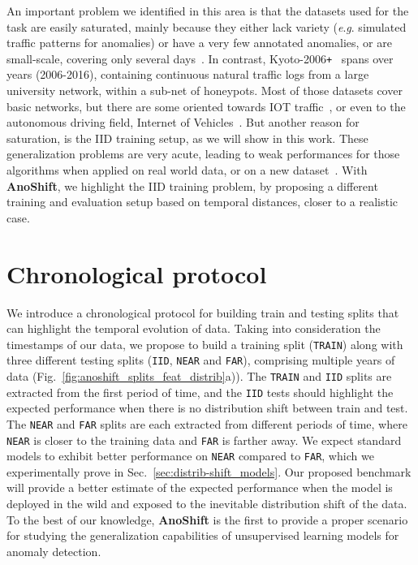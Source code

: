 \documentclass{article}
\newcommand{\eg}{\textit{e}.\textit{g}. }
\begin{document}
An important problem we identified in this area is that the datasets used for the task are easily saturated, mainly because they either lack variety (\eg simulated traffic patterns for anomalies) or have a very few annotated anomalies, or are small-scale, covering only several days~\cite{kddcup, NSL-KDD, cic_ids_2017, netflow_v1_iot, netflow_v2_iot, unsw_nb15, lanl, zyell_nctu, compare_nids}. In contrast, Kyoto-2006\texttt{+}~\cite{kyoto2006} spans over  years (2006-2016), containing continuous natural traffic logs from a large university network, within a sub-net of honeypots. Most of those datasets cover basic networks, but there are some oriented towards IOT traffic~\cite{netflow_v2_iot}, or even to the autonomous driving field, Internet of Vehicles~\cite{tree}. But another reason for saturation, is the IID training setup, as we will show in this work. These generalization problems are very acute, leading to weak performances for those algorithms when applied on real world data, or on a new dataset~\cite{nids_generalization}. With \textbf{AnoShift}, we highlight the IID training problem, by proposing a different training and evaluation setup based on temporal distances, closer to a realistic case.

\section{Chronological protocol}\label{sec:chronological_protocol}



We introduce a chronological protocol for building train and testing splits that can highlight the temporal evolution of data. Taking into consideration the timestamps of our data, we propose to build a training split (\texttt{TRAIN}) along with three different testing splits (\texttt{IID}, \texttt{NEAR} and \texttt{FAR}), comprising multiple years of data (Fig.~\ref{fig:anoshift_splits_feat_distrib}a)). The \texttt{TRAIN} and \texttt{IID} splits are extracted from the first period of time, and the \texttt{IID} tests should highlight the expected performance when there is no distribution shift between train and test. The \texttt{NEAR} and \texttt{FAR} splits are each extracted from different periods of time, where \texttt{NEAR} is closer to the training data and \texttt{FAR} is farther away.  We expect standard models to exhibit better performance on \texttt{NEAR} compared to \texttt{FAR}, which we experimentally prove in Sec.~\ref{sec:distrib-shift_models}. 
Our proposed benchmark will provide a better estimate of the expected performance when the model is deployed in the wild and exposed to the inevitable distribution shift of the data. To the best of our knowledge, \textbf{AnoShift} is the first to provide a proper scenario for studying the generalization capabilities of unsupervised learning models for anomaly detection. 
\end{document}
